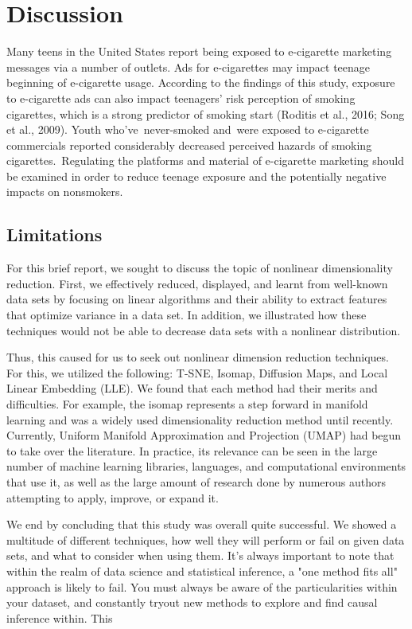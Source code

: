 \documentclass[12pt]{article}
\begin{document}
\section{Discussion} \label{sec:discussion}

\hspace{5mm}Many teens in the United States report being exposed to e-cigarette marketing messages via a number of outlets. Ads for e-cigarettes may impact teenage beginning of e-cigarette usage. According to the findings of this study, exposure to e-cigarette ads can also impact teenagers' risk perception of smoking cigarettes, which is a strong predictor of smoking start (Roditis et al., 2016; Song et al., 2009). Youth who've never-smoked and were exposed to e-cigarette commercials reported considerably decreased perceived hazards of smoking cigarettes. Regulating the platforms and material of e-cigarette marketing should be examined in order to reduce teenage exposure and the potentially negative impacts on nonsmokers. 


\subsection{Limitations}
\hspace{5mm}For this brief report, we sought to discuss the topic of nonlinear dimensionality reduction. First, we effectively reduced, displayed, and learnt from well-known data sets by focusing on linear algorithms and their ability to extract features that optimize variance in a data set. In addition, we illustrated how these techniques would not be able to decrease data sets with a nonlinear distribution.

Thus, this caused for us to seek out nonlinear dimension reduction techniques. For this, we utilized the following: T-SNE, Isomap, Diffusion Maps, and Local Linear Embedding (LLE). We found that each method had their merits and difficulties. For example, the isomap represents a step forward in manifold learning and was a widely used dimensionality reduction method until recently. Currently, Uniform Manifold Approximation and Projection (UMAP) had begun to take over the literature. In practice, its relevance can be seen in the large number of machine learning libraries, languages, and computational environments that use it, as well as the large amount of research done by numerous authors attempting to apply, improve, or expand it.

We end by concluding that this study was overall quite successful. We showed a multitude of different techniques, how well they will perform or fail on given data sets, and what to consider when using them. It's always important to note that within the realm of data science and statistical inference, a "one method fits all" approach is likely to fail. You must always be aware of the particularities within your dataset, and constantly tryout new methods to explore and find causal inference within. This 
\end{document}
